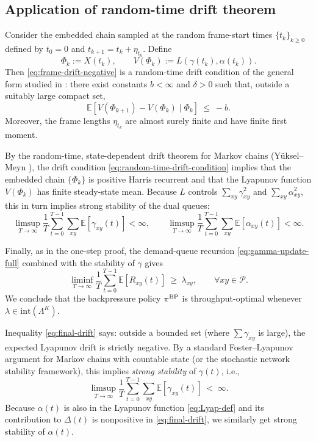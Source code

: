 \documentclass[11pt]{article}
\newcommand{\E}{\mathbb{E}}
\newcommand{\Pairs}{\mathcal{P}} %
\begin{document}
\subsection{Application of random-time drift theorem}

Consider the embedded chain sampled at the random frame-start times
$\{t_k\}_{k\ge 0}$ defined by $t_0=0$ and
$t_{k+1}=t_k+\eta_{t_k}$.  Define
\[
\Phi_k := X(t_k),\qquad
V(\Phi_k) := L(\gamma(t_k),\alpha(t_k)).
\]
Then \eqref{eq:frame-drift-negative} is a random-time drift condition
of the general form studied in \cite{YukselMeyn2013}: there exist
constants $b<\infty$ and $\delta>0$ such that, outside a suitably
large compact set,
\begin{equation}
\E\!\left[
V(\Phi_{k+1})-V(\Phi_k)\;\big|\;\Phi_k
\right]
\ \le\
-b.
\label{eq:random-time-drift-condition}
\end{equation}
Moreover, the frame lengths $\eta_{t_k}$ are almost surely finite and
have finite first moment.

By the random-time, state-dependent drift theorem for Markov chains
(Y\"uksel--Meyn \cite[Theorem~2.1]{YukselMeyn2013}), the drift
condition \eqref{eq:random-time-drift-condition} implies that the
embedded chain $\{\Phi_k\}$ is positive Harris recurrent and that the
Lyapunov function $V(\Phi_k)$ has finite steady-state mean.  Because
$L$ controls $\sum_{xy}\gamma_{xy}^2$ and
$\sum_{xy}\alpha_{xy}^2$, this in turn implies strong stability of the
dual queues:
\[
\limsup_{T\to\infty}
\frac{1}{T}\sum_{t=0}^{T-1}
\sum_{xy}\E[\gamma_{xy}(t)] < \infty,
\qquad
\limsup_{T\to\infty}
\frac{1}{T}\sum_{t=0}^{T-1}
\sum_{xy}\E[\alpha_{xy}(t)] < \infty.
\]

Finally, as in the one-step proof, the demand-queue recursion
\eqref{eq:gamma-update-full} combined with the stability of $\gamma$
gives
\[
\liminf_{T\to\infty}
\frac{1}{T}\sum_{t=0}^{T-1}
\E[R_{xy}(t)]
\ \ge\
\lambda_{xy},
\qquad \forall xy\in\Pairs.
\]
We conclude that the backpressure policy $\pi^{\rm BP}$ is
throughput-optimal whenever $\lambda\in\mathrm{int}(\Lambda^K)$.







Inequality \eqref{eq:final-drift} says: outside a bounded set (where $\sum\gamma_{xy}$ is large), the expected Lyapunov drift is strictly negative. By a standard Foster--Lyapunov argument for Markov chains with countable state (or the stochastic network stability framework), this implies \emph{strong stability} of $\gamma(t)$, i.e.,
\[
\limsup_{T\to\infty}\frac{1}{T}\sum_{t=0}^{T-1}\sum_{xy}\E[\gamma_{xy}(t)]
\ <\ \infty.
\]
Because $\alpha(t)$ is also in the Lyapunov function \eqref{eq:Lyap-def} and its contribution to $\Delta(t)$ is nonpositive in \eqref{eq:final-drift}, we similarly get strong stability of $\alpha(t)$.
\end{document}
